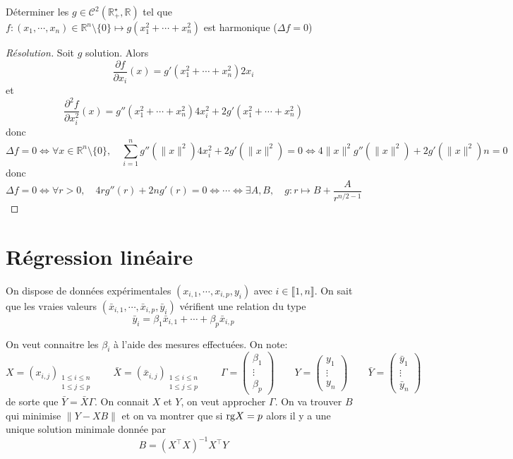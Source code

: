 \begin{exo}
    Déterminer les $g\in\mathcal C^2(\mathbb R_+^\star, \mathbb R)$ tel que $f:(x_1, \cdots, x_n)\in\mathbb R^n\setminus \{0\}\longmapsto g(x_1^2+ \cdots+ x_n^2)$ est harmonique ($\Delta f=0$)
\end{exo}

\begin{proof}[Résolution]
    Soit $g$ solution. Alors \[
        \frac{\partial f}{\partial x_i}(x)=g'(x_1^2+\cdots+x_n^2) 2x_i
    \]
    et \[
        \frac{\partial ^2 f}{\partial x_i^2}(x)=g''(x_1^2+\cdots+x_n^2)4x_i^2+2g'(x_1^2+\cdots +x_n^2) 
    \]
    donc \[
        \Delta f=0\iff \forall x\in\mathbb R^n\setminus \{0\}, \quad \sum_{i=1}^ng''(\|x\|^2)4x_i^2+2g'(\|x\|^2)=0 \iff 4\|x\|^2g''(\|x\|^2)+2g'(\|x\|^2)n=0
    \]
    donc \[
        \Delta f=0\iff \forall r>0, \quad 4rg''(r)+2ng'(r)=0\iff \cdots \iff \exists A, B, \quad g:r\longmapsto B+\frac{A}{r^{n/2-1}}
    \]
\end{proof}

\section{Régression linéaire}

On dispose de données expérimentales $(x_{i, 1}, \cdots, x_{i, p}, y_i)$ avec $i\in\llbracket 1, n\rrbracket$. On sait que les vraies valeurs $(\bar x_{i, 1}, \cdots, \bar x_{i, p}, \bar y_i)$ vérifient une relation du type \[
    \bar y_i=\beta_1\bar x_{i, 1}+\cdots+\beta_p\bar x_{i, p}
\]

On veut connaitre les $\beta_i$ à l'aide des mesures effectuées. On note: \[
    X=(x_{i, j})_{\substack{1\leq i\leq n\\ 1\leq j\leq p}} \qquad \bar X=(\bar x_{i, j})_{\substack{1\leq i\leq n\\ 1\leq j\leq p}} \qquad \Gamma= \begin{pmatrix}
        \beta_1\\ \vdots\\\beta_p
    \end{pmatrix} \qquad Y= \begin{pmatrix}
        y_1\\\vdots\\ y_n
    \end{pmatrix}\qquad \bar Y= \begin{pmatrix}
        \bar y_1\\\vdots\\ \bar y_n
    \end{pmatrix}
\]
de sorte que $\bar Y=\bar X\Gamma$. On connait $X$ et $Y$, on veut approcher $\Gamma$. On va trouver $B$ qui minimise $\|Y-XB\|$ et on va montrer que si $\mathrm{rg} X=p$ alors il y a une unique solution minimale donnée par \[
    B=(X^\top X)^{-1}X^\top Y
\]

